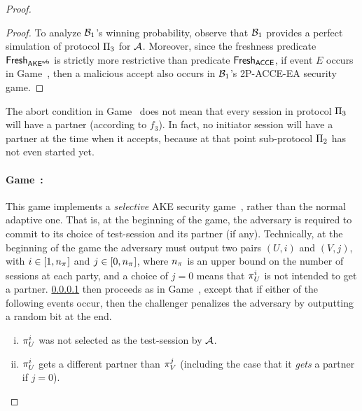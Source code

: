 \begin{proof}
\begin{proof}
To analyze $\A[B]_1$'s winning probability,
observe that $\A[B]_1$ provides a perfect simulation of protocol $\protocol_3$ for $\A$.
Moreover,
since the freshness predicate $\fresh_{\akewfs}$ is strictly more restrictive than predicate $\fresh_{\acce}$,
if event $E$ occurs in Game~\prevgame,
then a malicious accept also occurs in $\A[B]_1$'s 2P-ACCE-EA security game.
\end{proof}




\begin{remark}
The abort condition in Game~\game{} does not mean that every session in protocol \emph{$\protocol_3$} will have a partner (according to $f_3$).
In fact, 
no initiator session will have a partner at the time when it accepts, 
because at that point sub-protocol $\protocol_2$ has not even started yet.
\end{remark}






\newgame
\paragraph{Game~\game:}\label{game_hop:3P-KD:guess_test-session}
This game implements a \emph{selective} AKE security game~\cite[§3.3]{EPRINT:KraPatWee13},
rather than the normal adaptive one.
That is,
at the beginning of the game, 
the adversary is required to commit to its choice of test-session and its partner (if any).
Technically, 
at the beginning of the game the adversary must output two pairs $(U,i)$ and $(V,j)$,
with $i \in [1,\numsessions]$ and $j \in [0, \numsessions]$,
where $\numsessions$ is an upper bound on the number of sessions at each party,
and a choice of $j = 0$ means that $\oracle[U][i]$ is not intended to get a partner.
\cref{game_hop:3P-KD:guess_test-session} then proceeds as in Game~\prevgame{},
except that if either of the following events occur,
then the challenger penalizes the adversary by outputting a random bit at the end.
\begin{enumerate}[(i)]
	\item $\oracle[U][i]$ was not selected as the test-session by $\A$.
	
	\item $\oracle[U][i]$ gets a different partner than $\oracle[V][j]$
	(including the case that it \emph{gets} a partner if $j=0$).
	
\end{enumerate}


\end{proof}
